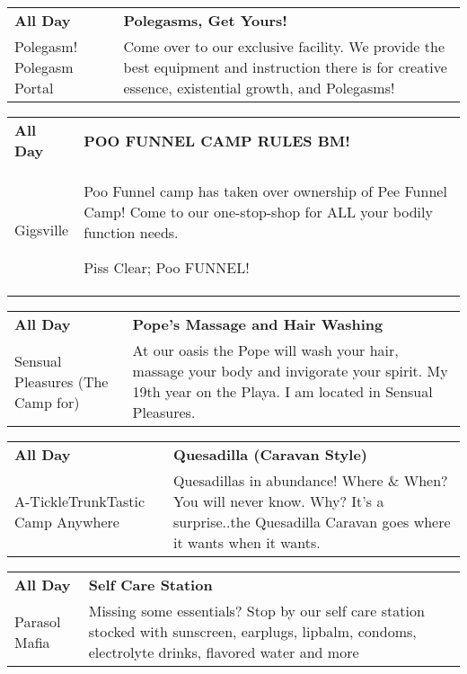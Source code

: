 \begin{tabular}{ p{1in} p{2.2in} }
    \textbf{All Day} & \textbf{Polegasms, Get Yours!} \\
    Polegasm! \newline Polegasm Portal & Come over to our exclusive facility. We provide the best equipment and instruction there is for creative essence, existential growth, and Polegasms! \\
    \hline 
\end{tabular}
    
\begin{tabular}{ p{1in} p{2.2in} }
    \textbf{All Day} & \textbf{POO FUNNEL CAMP RULES BM!} \\
    Gigsville \newline  & Poo Funnel camp has taken over ownership of Pee Funnel Camp! Come to our one-stop-shop for ALL your bodily function needs.

Piss Clear;
Poo FUNNEL! \\
    \hline 
\end{tabular}
    
\begin{tabular}{ p{1in} p{2.2in} }
    \textbf{All Day} & \textbf{Pope's Massage and Hair Washing} \\
    Sensual Pleasures (The Camp for) \newline  & At our oasis the Pope will wash your hair, massage your body and invigorate your spirit. My 19th year on the Playa. I am located in Sensual Pleasures. \\
    \hline 
\end{tabular}
    
\begin{tabular}{ p{1in} p{2.2in} }
    \textbf{All Day} & \textbf{Quesadilla (Caravan Style)} \\
    A-TickleTrunkTastic Camp \newline Anywhere & Quesadillas in abundance! Where \& When? You will never know. Why? It's a surprise..the Quesadilla Caravan goes where it wants when it wants. \\
    \hline 
\end{tabular}
    
\begin{tabular}{ p{1in} p{2.2in} }
    \textbf{All Day} & \textbf{Self Care Station} \\
    Parasol Mafia \newline  & Missing some essentials? Stop by our self care station stocked with sunscreen, earplugs, lipbalm, condoms, electrolyte drinks, flavored water and more \\
    \hline 
\end{tabular}
    
